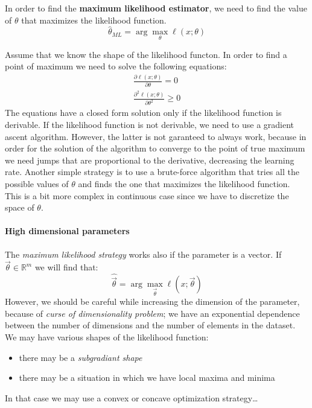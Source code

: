 \begin{theorem}
    In order to find the \textbf{maximum likelihood estimator}, we need to find the value of $\theta$ that maximizes the likelihood function.
    \[
        \hat{\theta}_{ML} = \arg\max_{\theta} \ell(x; \theta)
    \]
\end{theorem}

Assume that we know the shape of the likelihood functon. In order to find a point of maximum we need to solve the following equations:
\begin{align*}
    \frac{\partial \ell(x;\theta)}{\partial \theta} = 0 \\
    \frac{\partial^2 \ell(x;\theta)}{\partial \theta^2} \geq 0
\end{align*}
The equations have a closed form solution only if the likelihood function is derivable. If the likelihood function is not derivable, we need to use a gradient ascent algorithm. However, the latter is not garanteed to always work, because in order for the solution of the algorithm to converge to the point of true maximum we need jumps that are proportional to the derivative, decreasing the learning rate.
Another simple strategy is to use a brute-force algorithm that tries all the possible values of $\theta$ and finds the one that maximizes the likelihood function. This is a bit more complex in continuous case since we have to discretize the space of $\theta$.

\paragraph*{High dimensional parameters}
The \textit{maximum likelihood strategy} works also if the parameter is a vector. If $\vec{\theta} \in \mathbb{R}^m$ we will find that:
\[
    \hat{\vec{\theta}} = \arg\max_{\vec{\theta}}  \ell(x; \vec{\theta}) %
\]
However, we should be careful while increasing the dimension of the parameter, because of \textit{curse of dimensionality problem}; we have an exponential dependence between the number of dimensions and the number of elements in the dataset.
We may have various shapes of the likelihood function:
\begin{itemize}
    \item there may be a \textit{subgradiant shape}
    \item there may be a situation in which we have local maxima and minima
\end{itemize}
In that case we may use a convex or concave optimization strategy\dots
